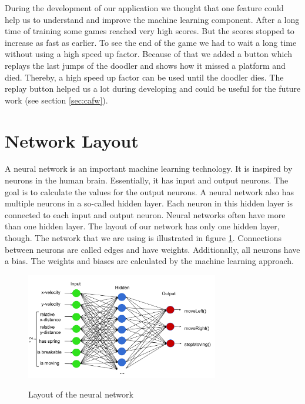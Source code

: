 \documentclass[a4paper,12pt,pagesize,headsepline,bibtotoc,titlepage,abstracton]{scrartcl}
\begin{document}
During the development of our application we thought that one feature could help us to understand and improve the machine learning component. After a long time of training some games reached very high scores. But the scores stopped to increase as fast as earlier. To see the end of the game we had to wait a long time without using a high speed up factor. Because of that we added a button which replays the last jumps of the doodler and shows how it missed a platform and died. Thereby, a high speed up factor can be used until the doodler dies. The replay button helped us a lot during developing and could be useful for the future work (see section \ref{sec:cafw}).

\section{Network Layout}

A neural network is an important machine learning technology. It is inspired by neurons in the human brain. Essentially, it has input and output neurons. The goal is to calculate the values for the output neurons. A neural network also has multiple neurons in a so-called hidden layer. Each neuron in this hidden layer is connected to each input and output neuron. Neural networks often have more than one hidden layer. The layout of our network has only one hidden layer, though. The network that we are using is illustrated in figure \ref{abb:nl}. Connections between neurons are called edges and have weights. Additionally, all neurons have a bias. The weights and biases are calculated by the machine learning approach.

\begin{figure}[h]
\begin{center}
\includegraphics*[width=0.75\textwidth]{images/network_layout}\\
\caption{Layout of the neural network}
\label{abb:nl}
\end{center}
\end{figure}
\end{document}
